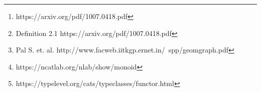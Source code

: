 \documentclass{article}
\begin{document}
\begin{abstract}
3: There exists the notion of a star cluster\footnote{https://arxiv.org/pdf/1007.0418.pdf} Such that star cluster $\sigma$ forms an independence complex of $K$.
\begin{equation} \label{eq1}
\begin{split}
SC(\sigma_k) = \bigcup_k st(n) \in I_G \ \forall k \in K
\end{split}
\end{equation}

Where $I_G$ is the set of all independence graphs of $K$\footnote{Definition 2.1 https://arxiv.org/pdf/1007.0418.pdf}. It follows from corollary (4) that

\begin{equation} \label{eq1}
\begin{split}
SC(\sigma_k) = \bigcup_k st(n) \\
\equiv st(n) \ \forall n \in k
\end{split}
\end{equation}

A hypergraph represents an arbitrary set of subsets of it a graph's vertex set, where each subset is called a edge\footnote{Pal S. et. al. http://www.facweb.iitkgp.ernet.in/~spp/geomgraph.pdf}. We define the the Radial abstract data type in terms of a hypergraph and mappings between vertex sets within that hypergraph. Specifically for given Tier $t \in \mathbb{N}$ (see above), we define the Radial monoid\footnote{https://ncatlab.org/nlab/show/monoid} $R_t$ as a functor\footnote{https://typelevel.org/cats/typeclasses/functor.html} over the category of simplexes such that

\begin{align*}
R^{n}_k: \\ &
starCluster: \{R^{n-1}_0 \dots R^{n-1}_j\} | j \subset k, \\ &
state: \{A\}, \\ &
hyperplane: \{n_0 \dots n_k\}_{n-1} \rightarrow \{n_0 \dots n_k\}_n , \\ \\
\end{align*}

The hypergraph for all simplexes $\sigma_k$ within Order $O$ is given by the two element set
\begin{equation} \label{eq1}
\begin{split}
H_{t,k} = \{I_{g_{t-1}} \ | \ g_{t-1} \subset G_{t-1}, \sigma_k \}
\end{split}
\end{equation}


\end{abstract}
\end{document}
